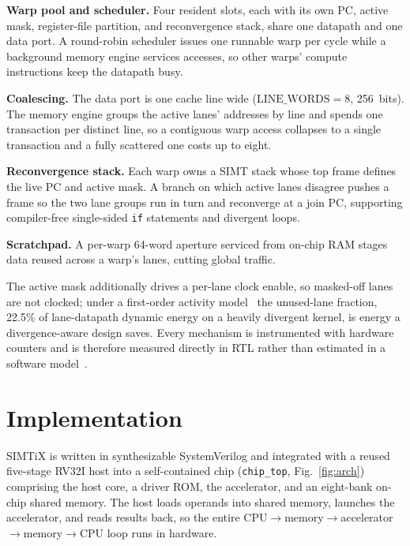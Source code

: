 \documentclass[10pt,conference]{IEEEtran}
\begin{document}
\textbf{Warp pool and scheduler.} Four resident slots, each with its own PC,
active mask, register-file partition, and reconvergence stack, share one datapath
and one data port. A round-robin scheduler issues one runnable warp per cycle
while a background memory engine services accesses, so other warps' compute
instructions keep the datapath busy.

\textbf{Coalescing.} The data port is one cache line wide
($\mathrm{LINE\_WORDS}=8$, 256~bits). The memory engine groups the active lanes'
addresses by line and spends one transaction per distinct line, so a contiguous
warp access collapses to a single transaction and a fully scattered one costs up
to eight.

\textbf{Reconvergence stack.} Each warp owns a SIMT stack whose top frame defines
the live PC and active mask. A branch on which active lanes disagree pushes a
frame so the two lane groups run in turn and reconverge at a join PC, supporting
compiler-free single-sided \texttt{if} statements and divergent loops.

\textbf{Scratchpad.} A per-warp 64-word aperture serviced from on-chip RAM stages
data reused across a warp's lanes, cutting global traffic.

The active mask additionally drives a per-lane clock enable, so masked-off lanes
are not clocked; under a first-order activity model~\cite{gpuwattch} the
unused-lane fraction, 22.5\% of lane-datapath dynamic energy on a heavily
divergent kernel, is energy a divergence-aware design saves. Every mechanism is
instrumented with hardware counters and is therefore measured directly in RTL
rather than estimated in a software model~\cite{gpgpusim}.

\section{Implementation}\label{sec:impl}
SIMTiX is written in synthesizable SystemVerilog and integrated with a reused
five-stage RV32I host into a self-contained chip (\texttt{chip\_top},
Fig.~\ref{fig:arch}) comprising the host core, a driver ROM, the accelerator, and
an eight-bank on-chip shared memory. The host loads operands into shared memory,
launches the accelerator, and reads results back, so the entire
CPU$\rightarrow$memory$\rightarrow$accelerator$\rightarrow$memory$\rightarrow$CPU
loop runs in hardware.
\end{document}
